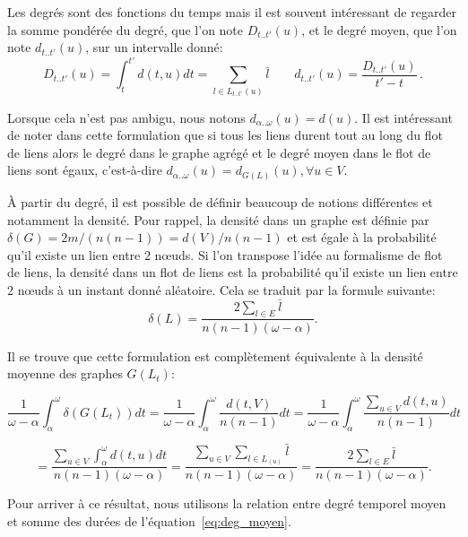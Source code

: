 Les degrés sont des fonctions du temps mais il est souvent intéressant de regarder la somme pondérée du degré, que l'on note $D_{t..t'}(u)$, et le degré moyen, que l'on note $d_{t..t'}(u)$, sur un intervalle donné:
\begin{equation}
D_{t..t'}(u)= \int_{t}^{t'}d(t,u) dt  = \sum_{l \in L_{t..t'}(u)}\bar{l} \qquad
d_{t..t'}(u)= \dfrac{D_{t..t'}(u)}{t'-t}\, .
\label{eq:deg_moyen}
\end{equation}

Lorsque cela n'est pas ambigu, nous notons $d_{\alpha..\omega}(u) = d(u)$.
Il est intéressant de noter dans cette formulation que si tous les liens durent tout au long du flot de liens alors le degré dans le graphe agrégé et le degré moyen dans le flot de liens sont égaux, c'est-à-dire  $d_{\alpha..\omega}(u) = d_{G(L)}(u), \forall u \in V$.

\`A partir du degré, il est possible de définir beaucoup de notions différentes et notamment la densité.
Pour rappel, la densité dans un graphe est définie par $\delta(G)=2m/(n(n-1))=d(V)/n(n-1)$ et est égale à la probabilité qu'il existe un lien entre 2 n\oe uds.
Si l'on transpose l'idée au formalisme de flot de liens, la densité dans un flot de liens est la probabilité qu'il existe un lien entre 2 n\oe uds à un instant donné aléatoire.
Cela se traduit par la formule suivante:
\begin{equation}
\delta(L)= \dfrac{2 \sum_{l \in E}\bar{l}}{n(n-1) (\omega-\alpha)}.
\end{equation}

Il se trouve que cette formulation est complètement équivalente à la densité moyenne des graphes $G(L_t)$:

\begin{equation*}
\dfrac{1}{\omega-\alpha} \int_{\alpha}^{\omega} \delta(G(L_t)) dt=
\dfrac{1}{\omega-\alpha} \int_{\alpha}^{\omega} \dfrac{d(t,V)}{n(n-1)}dt=
 \dfrac{1}{\omega-\alpha} \int_{\alpha}^{\omega} \dfrac{\sum_{u \in V} d(t,u)}{n(n-1)}dt
 \end{equation*}

 \begin{equation*}
= \dfrac{\sum_{u \in V} \int_{\alpha}^{\omega}d(t,u)dt}{n(n-1)(\omega-\alpha)} =
\dfrac{\sum_{u \in V} \sum_{l \in L_(u)} \bar{l}}{n(n-1)(\omega-\alpha)} =
\dfrac{2\sum_{l \in E}\bar{l}}{n(n-1) (\omega-\alpha)} .
\end{equation*}

Pour arriver à ce résultat, nous utilisons la relation entre degré temporel moyen et somme des durées de l'équation~\ref{eq:deg_moyen}.

